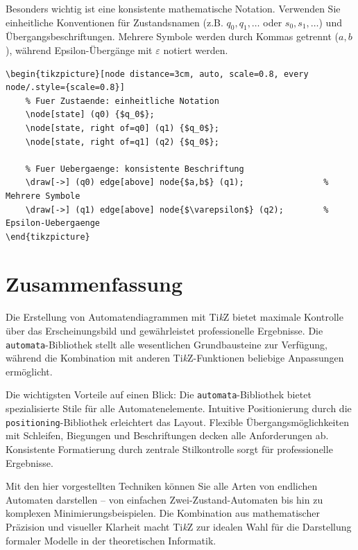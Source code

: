 Besonders wichtig ist eine konsistente mathematische Notation. Verwenden Sie einheitliche Konventionen für Zustandsnamen (z.B. $q_0, q_1, \ldots$ oder $s_0, s_1, \ldots$) und Übergangsbeschriftungen. Mehrere Symbole werden durch Kommas getrennt ($a,b$), während Epsilon-Übergänge mit $\varepsilon$ notiert werden.

\begin{lstlisting}[style=latex]
\begin{tikzpicture}[node distance=3cm, auto, scale=0.8, every node/.style={scale=0.8}]
	% Fuer Zustaende: einheitliche Notation
	\node[state] (q0) {$q_0$};
	\node[state, right of=q0] (q1) {$q_0$};
	\node[state, right of=q1] (q2) {$q_0$};
	
	% Fuer Uebergaenge: konsistente Beschriftung
	\draw[->] (q0) edge[above] node{$a,b$} (q1);        		% Mehrere Symbole
	\draw[->] (q1) edge[above] node{$\varepsilon$} (q2); 		% Epsilon-Uebergaenge
\end{tikzpicture}
\end{lstlisting}



\section{Zusammenfassung}

Die Erstellung von Automatendiagrammen mit Ti\textit{k}Z bietet maximale Kontrolle über das Erscheinungsbild und gewährleistet professionelle Ergebnisse. Die \texttt{automata}-Bibliothek stellt alle wesentlichen Grundbausteine zur Verfügung, während die Kombination mit anderen Ti\textit{k}Z-Funktionen beliebige Anpassungen ermöglicht.

Die wichtigsten Vorteile auf einen Blick: Die \texttt{automata}-Bibliothek bietet spezialisierte Stile für alle Automatenelemente. Intuitive Positionierung durch die \texttt{positioning}-Bibliothek erleichtert das Layout. Flexible Übergangsmöglichkeiten mit Schleifen, Biegungen und Beschriftungen decken alle Anforderungen ab. Konsistente Formatierung durch zentrale Stilkontrolle sorgt für professionelle Ergebnisse.

Mit den hier vorgestellten Techniken können Sie alle Arten von endlichen Automaten darstellen – von einfachen Zwei-Zustand-Automaten bis hin zu komplexen Minimierungsbeispielen. Die Kombination aus mathematischer Präzision und visueller Klarheit macht Ti\textit{k}Z zur idealen Wahl für die Darstellung formaler Modelle in der theoretischen Informatik.

